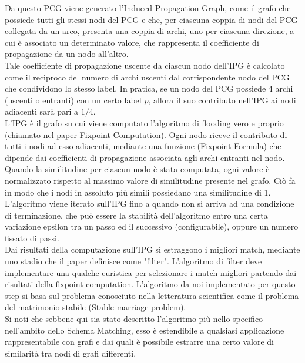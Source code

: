 \documentclass{article}
\begin{document}
Da questo PCG viene generato l'Induced Propagation Graph, come il grafo che possiede tutti gli stessi nodi del PCG e che, per ciascuna coppia di nodi del PCG collegata da un arco, presenta una coppia di archi, uno per ciascuna direzione, a cui è associato un determinato valore, che rappresenta il coefficiente di propagazione da un nodo all'altro.\\

Tale coefficiente di propagazione uscente da ciascun nodo dell'IPG è calcolato come il reciproco del numero di archi uscenti dal corrispondente nodo del PCG che condividono lo stesso label. In pratica, se un nodo del PCG possiede 4 archi (uscenti o entranti) con un certo label $p$, allora il suo contributo nell'IPG ai nodi adiacenti sarà pari a $1/4$.\\

L’IPG è il grafo su cui viene computato l’algoritmo di flooding vero e proprio (chiamato nel paper Fixpoint Computation). Ogni nodo riceve il contributo di tutti i nodi ad esso adiacenti, mediante una funzione (Fixpoint Formula) che dipende dai coefficienti di propagazione associata agli archi entranti nel nodo. Quando la similitudine per ciascun nodo è stata computata, ogni valore è normalizzato rispetto al massimo valore di similitudine presente nel grafo. Ciò fa in modo che i nodi in assoluto più simili possiedano una similitudine di 1.\\

L’algoritmo viene iterato sull’IPG fino a quando non si arriva ad una condizione di terminazione, che può essere la stabilità dell’algoritmo entro una certa variazione epsilon tra un passo ed il successivo (configurabile), oppure un numero fissato di passi.\\

Dai risultati della computazione sull’IPG si estraggono i migliori match, mediante uno stadio che il paper definisce come "filter". L'algoritmo di filter deve implementare una qualche euristica per selezionare i match migliori partendo dai risultati della fixpoint computation. L'algoritmo da noi implementato per questo step si basa sul problema conosciuto nella letteratura scientifica come il problema del matrimonio stabile (Stable marriage problem).\\

Si noti che sebbene qui sia stato descritto l'algoritmo più nello specifico nell'ambito dello Schema Matching, esso è estendibile a qualsiasi applicazione rappresentabile con grafi e dai quali è possibile estrarre una certo valore di similarità tra nodi di grafi differenti. \\
\end{document}
